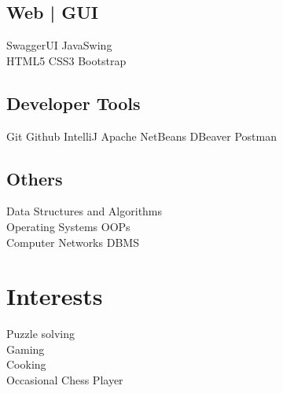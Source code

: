 \documentclass[]{deedy-resume-openfont}
\begin{document}
\begin{minipage}[t]{0.33\textwidth}
\subsection{Web | GUI}
\textbullet{} SwaggerUI
\textbullet{} JavaSwing \\ \textbullet{} HTML5 \textbullet{} CSS3 \textbullet{} Bootstrap \\
\sectionsep

\subsection{Developer Tools}
 \textbullet{} Git \textbullet{} Github \textbullet{} IntelliJ \textbullet{} Apache NetBeans \textbullet{} DBeaver \textbullet{} Postman\\


\sectionsep

\subsection{Others}
\textbullet{} Data Structures and Algorithms \\ \textbullet{} Operating Systems
\textbullet{} OOPs \\
\textbullet{} Computer Networks \textbullet{} DBMS 
\sectionsep


\section{Interests}
\textbullet{} Puzzle solving  \\ 
\textbullet{} Gaming  \\ 
\textbullet{} Cooking \\
\textbullet{} Occasional Chess Player \\
\sectionsep

%
%

\end{minipage} 
\hfill
\end{document}
